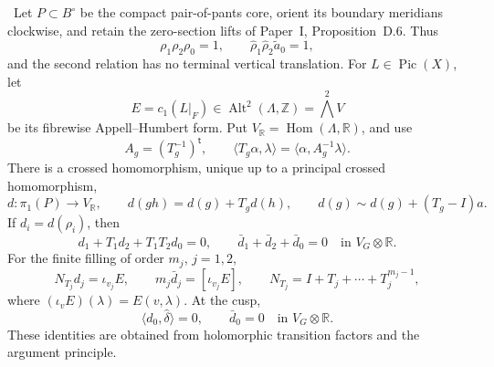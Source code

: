 \begin{proposition}
\label{wbII:prop:analytic-ah-boundary}
\ Let \(P\subset B^\circ\) be the compact pair-of-pants core,
orient its boundary meridians clockwise, and retain the zero-section lifts
of Paper~I, Proposition~D.6.  Thus
\[
 \rho_1\rho_2\rho_0=1,
 \qquad
 \widehat\rho_1\widehat\rho_2\widetilde a_0=1,
\tag{W.93}\label{wbII:eq:W:5.17-A1}
\]
and the second relation has no terminal vertical translation.  For
\(L\in\operatorname{Pic}(X)\), let
\[
 E=c_1(L|_F)\in\operatorname{Alt}^2(\Lambda,\mathbb Z)
   =\bigwedge^2V
\]
be its fibrewise Appell--Humbert form.  Put
\(V_{\mathbb R}=\operatorname{Hom}(\Lambda,\mathbb R)\), and use
\[
 A_g=(T_g^{-1})^{\mathsf t},
 \qquad
 \langle T_g\alpha,\lambda\rangle
 =\langle\alpha,A_g^{-1}\lambda\rangle.
\tag{W.94}\label{wbII:eq:W:5.17-A2}
\]
There is a crossed homomorphism, unique up to a principal crossed
homomorphism,
\[
 d:\pi_1(P)\longrightarrow V_{\mathbb R},
 \qquad
 d(gh)=d(g)+T_gd(h),
 \qquad
 d(g)\sim d(g)+(T_g-I)a.
\tag{W.95}\label{wbII:eq:W:5.17-A3}
\]
If \(d_i=d(\rho_i)\), then
\[
 d_1+T_1d_2+T_1T_2d_0=0,
 \qquad
 \bar d_1+\bar d_2+\bar d_0=0
 \quad\text{in }V_G\otimes\mathbb R.
\tag{W.96}\label{wbII:eq:W:5.17-A4}
\]
For the finite filling of order \(m_j\), \(j=1,2\),
\[
 N_{T_j}d_j=\iota_{v_j}E,
 \qquad
 m_j\bar d_j=[\iota_{v_j}E],
 \qquad
 N_{T_j}=I+T_j+\cdots+T_j^{m_j-1},
\tag{W.97}\label{wbII:eq:W:5.17-A5}
\]
where \((\iota_vE)(\lambda)=E(v,\lambda)\).  At the cusp,
\[
 \langle d_0,\widehat\delta\rangle=0,
 \qquad
 \bar d_0=0\quad\text{in }V_G\otimes\mathbb R.
\tag{W.98}\label{wbII:eq:W:5.17-A6}
\]
These identities are obtained from holomorphic transition factors and the
argument principle.
\end{proposition}


